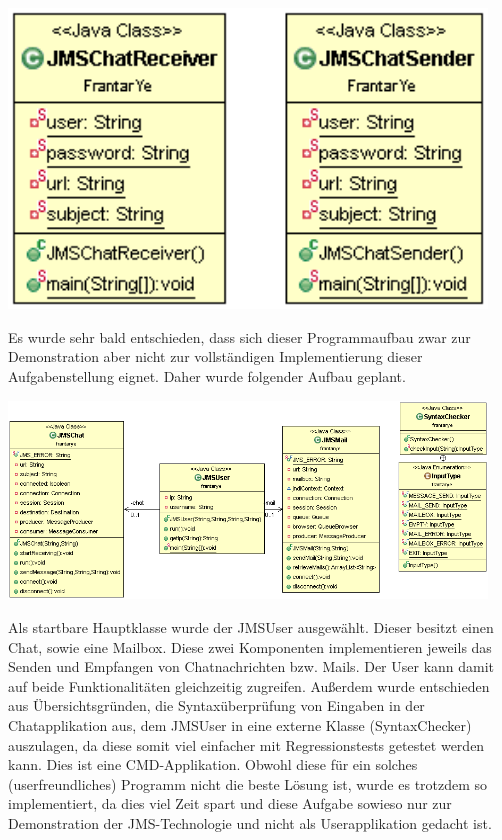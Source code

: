 \documentclass[11pt, a4paper]{article}
\begin{document}
\includegraphics[width=5in]{pic/Ausgangslage_UML.png}

Es wurde sehr bald entschieden, dass sich dieser Programmaufbau zwar zur Demonstration aber nicht zur vollständigen Implementierung dieser Aufgabenstellung
eignet. Daher wurde folgender Aufbau geplant.

\includegraphics[width=5in]{pic/DesignPlanung_UML.png}

Als startbare Hauptklasse wurde der JMSUser ausgewählt. Dieser besitzt einen Chat, sowie eine Mailbox. Diese zwei Komponenten implementieren jeweils das
Senden und Empfangen von Chatnachrichten bzw. Mails. Der User kann damit auf beide Funktionalitäten gleichzeitig zugreifen. Außerdem wurde entschieden aus
Übersichtsgründen, die Syntaxüberprüfung von Eingaben in der Chatapplikation aus, dem JMSUser in eine externe Klasse (SyntaxChecker) auszulagen, da diese
somit viel einfacher mit Regressionstests getestet werden kann.
Dies ist eine CMD-Applikation. Obwohl diese für ein solches (userfreundliches) Programm nicht die beste Lösung ist, wurde es trotzdem so implementiert, da
dies viel Zeit spart und diese Aufgabe sowieso nur zur Demonstration der JMS-Technologie und nicht als Userapplikation gedacht ist.


\newpage
\end{document}
